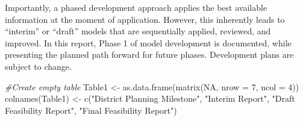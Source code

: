 \documentclass[
]{book}
\newenvironment{Shaded}{\begin{snugshade}}{\end{snugshade}}
\newcommand{\AttributeTok}[1]{\textcolor[rgb]{0.77,0.63,0.00}{#1}}
\newcommand{\CommentTok}[1]{\textcolor[rgb]{0.56,0.35,0.01}{\textit{#1}}}
\newcommand{\ConstantTok}[1]{\textcolor[rgb]{0.00,0.00,0.00}{#1}}
\newcommand{\DecValTok}[1]{\textcolor[rgb]{0.00,0.00,0.81}{#1}}
\newcommand{\FunctionTok}[1]{\textcolor[rgb]{0.00,0.00,0.00}{#1}}
\newcommand{\NormalTok}[1]{#1}
\newcommand{\OtherTok}[1]{\textcolor[rgb]{0.56,0.35,0.01}{#1}}
\newcommand{\StringTok}[1]{\textcolor[rgb]{0.31,0.60,0.02}{#1}}
\begin{document}
Importantly, a phased development approach applies the best available information at the moment of application. However, this inherently leads to ``interim'' or ``draft'' models that are sequentially applied, reviewed, and improved. In this report, Phase 1 of model development is documented, while presenting the planned path forward for future phases. Development plans are subject to change.

\begin{Shaded}
\begin{Highlighting}[]
\CommentTok{\#Create empty table}
\NormalTok{Table1 }\OtherTok{\textless{}{-}} \FunctionTok{as.data.frame}\NormalTok{(}\FunctionTok{matrix}\NormalTok{(}\ConstantTok{NA}\NormalTok{, }\AttributeTok{nrow =} \DecValTok{7}\NormalTok{, }\AttributeTok{ncol =} \DecValTok{4}\NormalTok{))}
\FunctionTok{colnames}\NormalTok{(Table1) }\OtherTok{\textless{}{-}} \FunctionTok{c}\NormalTok{(}\StringTok{"District Planning Milestone"}\NormalTok{, }\StringTok{"Interim Report"}\NormalTok{, }\StringTok{"Draft Feasibility Report"}\NormalTok{, }\StringTok{"Final Feasibility Report"}\NormalTok{)}


\end{Highlighting}
\end{Shaded}
\end{document}

